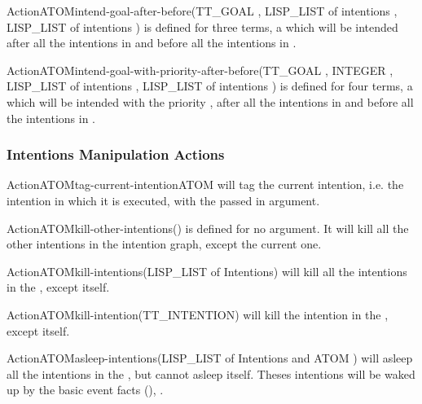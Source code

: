 \begin{typeefa}{Action}{ATOM}{intend-goal-after-before}{(TT\_GOAL
,
LISP\_LIST of intentions , LISP\_LIST of intentions )} is
defined for three terms, a   which will be intended
after all the intentions in  and before all the intentions in
.
\end{typeefa}

\begin{typeefa}{Action}{ATOM}{intend-goal-with-priority-after-before}{(TT\_GOAL , INTEGER , LISP\_LIST of intentions ,
LISP\_LIST of intentions )}
is defined for four terms, a   which will be
intended  with the priority , after all the intentions in
 and before all the intentions in .
\end{typeefa}

\subsubsection{Intentions Manipulation Actions}

\begin{typeefa}{Action}{ATOM}{tag-current-intention}{ATOM }
will tag the current intention, i.e. the intention in which it is executed, with
the  passed in argument.
\end{typeefa}

\begin{typeefa}{Action}{ATOM}{kill-other-intentions}{()}
is defined for no argument. It will kill all the other intentions in the
intention graph, except the current one.
\end{typeefa}

\begin{typeefa}{Action}{ATOM}{kill-intentions}{(LISP\_LIST of Intentions)}
will kill all the intentions in the , except itself.
\end{typeefa}

\begin{typeefa}{Action}{ATOM}{kill-intention}{(TT\_INTENTION)}
will kill the intention in the , except itself.
\end{typeefa}

\begin{typeefa}{Action}{ATOM}{asleep-intentions}{(LISP\_LIST of Intentions and ATOM )}
will asleep all the intentions in the , but cannot asleep itself.
Theses intentions will be waked up by the basic event facts (),  .
\end{typeefa}

